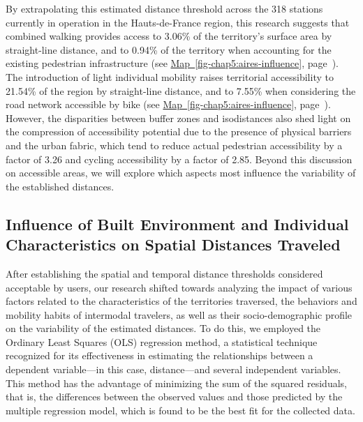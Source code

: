 \begin{refsegment}
By extrapolating this estimated distance threshold across the 318 stations currently in operation in the Hauts-de-France region, this research suggests that combined walking provides access to 3.06\% of the territory’s surface area by straight-line distance, and to 0.94\% of the territory when accounting for the existing pedestrian infrastructure (see \hyperref[fig-chap5:impedance-distances]{Map~\ref{fig-chap5:aires-influence}}, page~\pageref{fig-chap5:aires-influence}). The introduction of light individual mobility raises territorial accessibility to 21.54\% of the region by straight-line distance, and to 7.55\% when considering the road network accessible by bike (see \hyperref[fig-chap5:impedance-distances]{Map~\ref{fig-chap5:aires-influence}}, page~\pageref{fig-chap5:aires-influence}). However, the disparities between buffer zones and isodistances also shed light on the compression of accessibility potential due to the presence of physical barriers and the urban fabric, which tend to reduce actual pedestrian accessibility by a factor of 3.26 and cycling accessibility by a factor of 2.85. Beyond this discussion on accessible areas, we will explore which aspects most influence the variability of the established distances.%

\subsection{Influence of Built Environment and Individual Characteristics on Spatial Distances Traveled
    \label{chap5:regression-distances}
    }

After establishing the spatial and temporal distance thresholds considered acceptable by users, our research shifted towards analyzing the impact of various factors related to the characteristics of the territories traversed, the behaviors and mobility habits of intermodal travelers, as well as their socio-demographic profile on the variability of the estimated distances. To do this, we employed the Ordinary Least Squares (OLS) regression method, a statistical technique recognized for its effectiveness in estimating the relationships between a dependent variable—in this case, distance—and several independent variables. This method has the advantage of minimizing the sum of the squared residuals, that is, the differences between the observed values and those predicted by the multiple regression model, which is found to be the best fit for the collected data.%


\end{refsegment}
